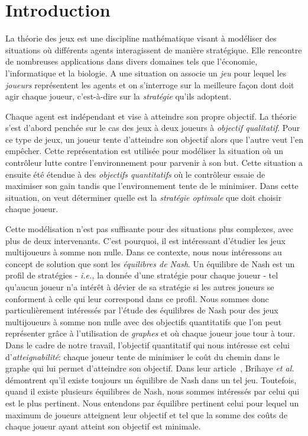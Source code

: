 
\section{Introduction}

La théorie des jeux est une discipline mathématique visant à modéliser des situations où différents agents interagissent de manière stratégique. Elle rencontre de nombreuses applications dans divers domaines tels que l'économie, l'informatique et la biologie.
A une situation on associe un \emph{jeu} pour lequel les \emph{joueurs} représentent les agents et on s'interroge sur la meilleure façon dont doit agir chaque joueur, c'est-à-dire sur la \emph{stratégie} qu'ils adoptent.

Chaque agent est indépendant et vise à atteindre son propre objectif. La théorie s'est d'abord penchée sur le cas des jeux à deux joueurs à \emph{objectif qualitatif}. Pour ce type de jeux, un joueur tente d'atteindre son objectif alors que l'autre veut l'en empêcher. Cette représentation est utilisée pour modéliser la situation où un contrôleur lutte contre l'environnement pour parvenir à son but. Cette situation a ensuite été étendue à des \emph{objectifs quantitatifs} où le contrôleur essaie de maximiser son gain tandis que l'environnement tente de le minimiser. Dans cette situation, on veut déterminer quelle est la \emph{stratégie optimale} que doit choisir chaque joueur.

Cette modélisation n'est pas suffisante pour des situations plus complexes, avec plus de deux intervenants. C'est pourquoi, il est intéressant d'étudier les jeux multijoueurs à somme non nulle. Dans ce contexte, nous nous intéressons au concept de solution que sont les \emph{équilibres de Nash}. Un équilibre de Nash est un profil de stratégies - \emph{i.e.,} la donnée d'une stratégie pour chaque joueur - tel qu'aucun joueur n'a intérêt à dévier de sa stratégie si les autres joueurs se conforment à celle qui leur correspond dans ce profil.
Nous sommes donc particulièrement intéressés par l'étude des équilibres de Nash pour des jeux multijoueurs à somme non nulle avec des objectifs quantitatifs que l'on peut représenter grâce à l'utilisation de \emph{graphes} et où chaque joueur joue tour à tour.\\


Dans le cadre de notre travail, l'objectif quantitatif qui nous intéresse est celui d'\emph{atteignabilité}: chaque joueur tente de minimiser le coût du chemin dans le graphe qui lui permet d'atteindre son objectif. Dans leur article~\cite{DBLP:conf/lfcs/BrihayePS13}, Brihaye \emph{et al.} démontrent qu'il existe toujours un équilibre de Nash dans un tel jeu. Toutefois, quand il existe plusieurs équilibres de Nash, nous sommes intéressés par celui qui est le plus pertinent. Nous entendons par équilibre pertinent  celui pour lequel un maximum de joueurs atteignent leur objectif et tel que la somme des coûts de chaque joueur ayant atteint son objectif est minimale.

